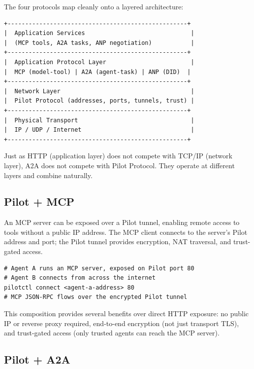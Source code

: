 \documentclass[11pt,a4paper]{article}
\begin{document}
The four protocols map cleanly onto a layered architecture:

\begin{lstlisting}[language={},keywords={},basicstyle=\ttfamily\small]
+---------------------------------------------------+
|  Application Services                              |
|  (MCP tools, A2A tasks, ANP negotiation)           |
+---------------------------------------------------+
|  Application Protocol Layer                        |
|  MCP (model-tool) | A2A (agent-task) | ANP (DID)  |
+---------------------------------------------------+
|  Network Layer                                     |
|  Pilot Protocol (addresses, ports, tunnels, trust) |
+---------------------------------------------------+
|  Physical Transport                                |
|  IP / UDP / Internet                               |
+---------------------------------------------------+
\end{lstlisting}

Just as HTTP (application layer) does not compete with TCP/IP (network layer), A2A does not compete with Pilot Protocol. They operate at different layers and combine naturally.

\subsection{Pilot + MCP}

An MCP server can be exposed over a Pilot tunnel, enabling remote access to tools without a public IP address. The MCP client connects to the server's Pilot address and port; the Pilot tunnel provides encryption, NAT traversal, and trust-gated access.

\begin{lstlisting}[language={},keywords={pilotctl},morekeywords={connect}]
# Agent A runs an MCP server, exposed on Pilot port 80
# Agent B connects from across the internet
pilotctl connect <agent-a-address> 80
# MCP JSON-RPC flows over the encrypted Pilot tunnel
\end{lstlisting}

This composition provides several benefits over direct HTTP exposure: no public IP or reverse proxy required, end-to-end encryption (not just transport TLS), and trust-gated access (only trusted agents can reach the MCP server).

\subsection{Pilot + A2A}
\end{document}

